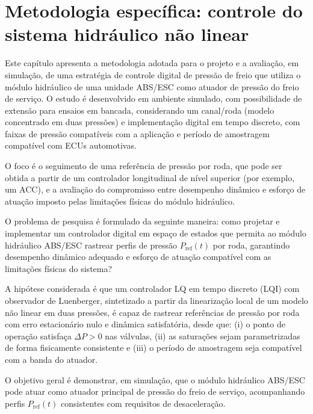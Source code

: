 \chapter{Metodologia específica: controle do sistema hidráulico não linear}
\label{cap:controle}

Este capítulo apresenta a metodologia adotada para o projeto e a avaliação, em simulação, de uma estratégia de controle digital de pressão de freio que utiliza o módulo hidráulico de uma unidade ABS/ESC como atuador de pressão do freio de serviço. O estudo é desenvolvido em ambiente simulado, com possibilidade de extensão para ensaios em bancada, considerando um canal/roda (modelo concentrado em duas pressões) e implementação digital em tempo discreto, com faixas de pressão compatíveis com a aplicação e período de amostragem compatível com ECUs automotivas.

O foco é o seguimento de uma referência de pressão por roda, que pode ser obtida a partir de um controlador longitudinal de nível superior (por exemplo, um ACC), e a avaliação do compromisso entre desempenho dinâmico e esforço de atuação imposto pelas limitações físicas do módulo hidráulico.

O problema de pesquisa é formulado da seguinte maneira: como projetar e implementar um controlador digital em espaço de estados que permita ao módulo hidráulico ABS/ESC rastrear perfis de pressão $P_{\mathrm{ref}}(t)$ por roda, garantindo desempenho dinâmico adequado e esforço de atuação compatível com as limitações físicas do sistema?

A hipótese considerada é que um controlador LQ em tempo discreto (LQI) com observador de Luenberger, sintetizado a partir da linearização local de um modelo não linear em duas pressões, é capaz de rastrear referências de pressão por roda com erro estacionário nulo e dinâmica satisfatória, desde que: (i) o ponto de operação satisfaça $\Delta P>0$ nas válvulas, (ii) as saturações sejam parametrizadas de forma fisicamente consistente e (iii) o período de amostragem seja compatível com a banda do atuador.

O objetivo geral é demonstrar, em simulação, que o módulo hidráulico ABS/ESC pode atuar como atuador principal de pressão do freio de serviço, acompanhando perfis $P_{\mathrm{ref}}(t)$ consistentes com requisitos de desaceleração.

